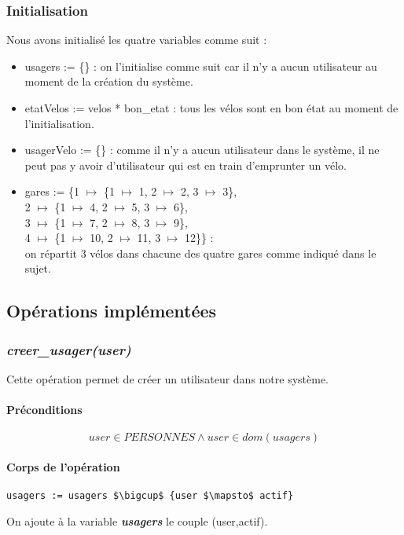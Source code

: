 \documentclass[12pt]{article}
\begin{document}
\subsubsection{Initialisation}
Nous avons initialisé les quatre variables comme suit :
\begin{itemize}
  \item usagers := \{\} : on l'initialise comme suit car il n'y a aucun utilisateur au moment de la création du système.
  \item etatVelos := velos * {bon\_etat} : tous les vélos sont en bon état au moment de l'initialisation.
  \item usagerVelo := \{\} : comme il n'y a aucun utilisateur dans le système, il ne peut pas y avoir d'utilisateur qui est en train d'emprunter un vélo.
  \item gares := \{1 $\mapsto$ \{1 $\mapsto$ 1, 2 $\mapsto$ 2, 3 $\mapsto$ 3\},\\ 2 $\mapsto$ \{1 $\mapsto$ 4, 2 $\mapsto$ 5, 3 $\mapsto$ 6\},\\ 3 $\mapsto$ \{1 $\mapsto$ 7, 2 $\mapsto$ 8, 3 $\mapsto$ 9\},\\ 4 $\mapsto$ \{1 $\mapsto$ 10, 2 $\mapsto$ 11, 3 $\mapsto$ 12\}\} :\\ on répartit 3 vélos dans chacune des quatre gares comme indiqué dans le sujet.
\end{itemize}
\subsection{Opérations implémentées}
\subsubsection{\textit{creer\_usager(user)}}
Cette opération permet de créer un utilisateur dans notre système.
\paragraph{Préconditions}
\[user \in PERSONNES \land user \in dom(usagers)\]
\paragraph{Corps de l'opération}
\textbf{}
\begin{lstlisting}[mathescape]
  usagers := usagers $\bigcup$ {user $\mapsto$ actif}
\end{lstlisting}

On ajoute à la variable \textit{\textbf{usagers}} le couple (user,actif).
\end{document}
